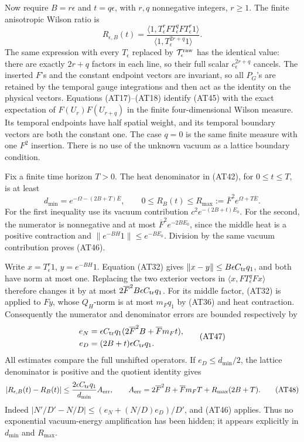 \documentclass[11pt]{article}
\begin{document}
Now require \(B=r\epsilon\) and \(t=q\epsilon\), with \(r,q\) nonnegative integers, \(r\ge1\). The finite anisotropic Wilson ratio is
\[
 R_{\epsilon,B}(t)=
 \frac{\langle1,T_\epsilon^rF T_\epsilon^qF T_\epsilon^r1\rangle}
      {\langle1,T_\epsilon^{2r+q}1\rangle}.
 \tag{AT45}
\]
The same expression with every \(T_\epsilon\) replaced by
\({\cal T}^{\rm raw}_\epsilon\) has the identical value: there are exactly \(2r+q\) factors in each line, so their full scalar \(c_\epsilon^{2r+q}\) cancels. The inserted \(F\)'s and the constant endpoint vectors are invariant, so all \(P_G\)'s are retained by the temporal gauge integrations and then act as the identity on the physical vectors. Equations (AT17)–(AT18) identify (AT45) with the exact expectation of \(F(U_r)F(U_{r+q})\) in the finite four-dimensional Wilson measure. Its temporal endpoints have half spatial weight, and its temporal boundary vectors are both the constant one. The case \(q=0\) is the same finite measure with one \(F^2\) insertion. There is no use of the unknown vacuum as a lattice boundary condition.

Fix a finite time horizon \(T>0\). The heat denominator in (AT42), for \(0\le t\le T\), is at least
\[
 d_{\min}=e^{-\Omega-(2B+T)\overline E},\qquad
 0\le R_B(t)\le R_{\max}:=
                 \overline F^2 e^{\Omega+T\overline E}.
 \tag{AT46}
\]
For the first inequality use its vacuum contribution
\(c^2e^{-(2B+t)E_0}\). For the second, the numerator is nonnegative and at most
\(\overline F^2 e^{-2BE_0}\), since the middle heat is a positive contraction and
\(\|e^{-BH}1\|\le e^{-BE_0}\). Division by the same vacuum contribution proves (AT46).

Write \(x=T_\epsilon^r1\), \(y=e^{-BH}1\).
Equation (AT32) gives
\(\|x-y\|\le B\epsilon C_{\rm tr}q_1\), and both have norm at most one. Replacing the two exterior vectors in
\(\langle x,FT_\epsilon^qFx\rangle\) therefore changes it by at most
\(2\overline F^2B\epsilon C_{\rm tr}q_1\).
For its middle factor, (AT32) is applied to \(Fy\), whose \(Q_H\)-norm is at most \(m_Fq_1\) by (AT36) and heat contraction. Consequently the numerator and denominator errors are bounded respectively by
\[
 \begin{aligned}
 e_N&=\epsilon C_{\rm tr}q_1
              (2\overline F^2B+\overline F m_Ft),\\
 e_D&=(2B+t)\epsilon C_{\rm tr}q_1 .
 \end{aligned}\tag{AT47}
\]
All estimates compare the full unshifted operators. If \(e_D\le d_{\min}/2\), the lattice denominator is positive and the quotient identity gives
\[
 |R_{\epsilon,B}(t)-R_B(t)|
 \le\frac{2\epsilon C_{\rm tr}q_1}{d_{\min}}A_{\rm err},\qquad
 A_{\rm err}=2\overline F^2B+\overline F m_FT
                         +R_{\max}(2B+T).
 \tag{AT48}
\]
Indeed \(|N'/D'-N/D|\le(e_N+(N/D)e_D)/D'\), and (AT46) applies.
Thus no exponential vacuum-energy amplification has been hidden; it appears explicitly in \(d_{\min}\) and \(R_{\max}\).
\end{document}
